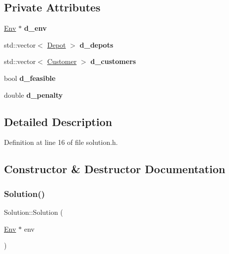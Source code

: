 \subsection*{Private Attributes}
\begin{DoxyCompactItemize}
\item 
\mbox{\label{class_solution_a9d210c71836c3d0195c14322d1a59ed8}} 
\hyperlink{class_env}{Env} $\ast$ {\bfseries d\+\_\+env}
\item 
\mbox{\label{class_solution_a78d6e40ffd00ad0ab0d811ba1cdff377}} 
std\+::vector$<$ \hyperlink{class_depot}{Depot} $>$ {\bfseries d\+\_\+depots}
\item 
\mbox{\label{class_solution_aa639f6f348d3e2014491d62eeccd1d2a}} 
std\+::vector$<$ \hyperlink{class_customer}{Customer} $>$ {\bfseries d\+\_\+customers}
\item 
\mbox{\label{class_solution_a195ca2bc3ad2abee9346ddb40bd324c1}} 
bool {\bfseries d\+\_\+feasible}
\item 
\mbox{\label{class_solution_a553459be3bb9cb467c4482eb9c260815}} 
double {\bfseries d\+\_\+penalty}
\end{DoxyCompactItemize}


\subsection{Detailed Description}


Definition at line 16 of file solution.\+h.



\subsection{Constructor \& Destructor Documentation}
\mbox{\label{class_solution_a3bdbdf455adecf7ab0f71bbce1efad66}} 
\subsubsection{\texorpdfstring{Solution()}{Solution()}}
{\footnotesize\ttfamily Solution\+::\+Solution (\begin{DoxyParamCaption}\item[{\hyperlink{class_env}{Env} $\ast$}]{env }\end{DoxyParamCaption})}



